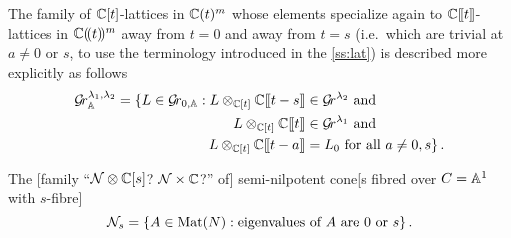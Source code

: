 \documentclass[draft]{article}
\begin{document}
The family  of $\CC[t]$-lattices in $\CC(t)^m$ whose elements specialize again to $\CC\xt$-lattices in $\CC\xT^m$ away from $t = 0$ and away from $t = s$ (i.e.\ which are trivial at $a \ne 0$ or $s$, to use the terminology introduced in the \cref{ss:lat}) is described more explicitly as follows
\begin{equation}
    \label{eq:defGrBDlambda}
    \begin{split}
        \Gr_{\AA}^{\lambda_1,\lambda_2} = 
        \{L \in\Grbd : 
        L \otimes_{\CC[t]} \CC\xt[t-s] 
        &\in \Gr^{\lambda_2} \text{ and } \\
        L\otimes_{\CC[t]} \CC\xt &\in \Gr^{\lambda_1} \text{ and } \\ 
        L \otimes_{\CC[t]} \CC\xt[t-a] &= L_0 \text{ for all $ a \ne 0, s$} \}\,.
    \end{split}
\end{equation}

% 

The [family ``$\cN\otimes\CC[s]$? $\cN\times\CC$?'' of] semi-nilpotent cone[s fibred over $C = \AA^1$ with $s$-fibre] 
\begin{equation}
    \cN_s = \{A \in \mat(N) : \text{eigenvalues of } A \text{ are } 0 \text{ or }s\}\,.
\end{equation}

\begin{comment}
    The [family of] slice[s $\TT_{\mu_1,\mu_2}$ fibred over $C=\AA^1$ with $s$-fibre]
\begin{equation}
    \begin{split}
        \TT_{\mu_1,\mu_2}^s = \{ B + C_s: B &\text{ is a }\mu\times\mu \text{ block matrix of zeros} \\
        &\text{except possibly in the last }\min(\mu_i,\mu_j) \\ 
        &\text{columns of the last row of each }\mu_i\times\mu_j \text{ block} \\
        &\text{and } C_s \text{ is the block diagonal matrix of}\\
        &\text{companion matrices of } t^{\mu_{1,k}}(t-s)^{\mu_{2,k}}\}\,.
    \end{split}
\end{equation}

The uppertriangular subfamily $\TT_{\mu_1,\mu_2}^{+}$ with $s$-fibre
\begin{equation}
    \TT_{\mu_1,\mu_2}^{+,s} = \{B + C_s \in \TT_{\mu_1,\mu_2} : B \in\n\}
\end{equation}
where $\n\subset\mat(N)$ is the unipotent subalgebra of uppertriangular matrices.
\end{comment}
\end{document}
